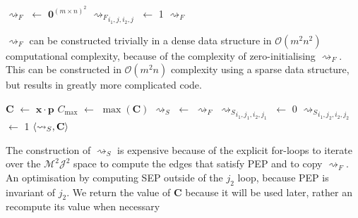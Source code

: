 \begin{algorithm}[H]
	\caption{}
	\begin{algorithmic}[1]
			\State $\rightsquigarrow_F$ $\gets$ $\mathbf{0}^{(m\times n)^2}$
							\State ${\rightsquigarrow_F}_{i_1,j,i_2,j}$ $\gets$ 1
						\EndIf
					\EndFor
				\EndFor
			\EndFor
			\State \Return $\rightsquigarrow_F$
		\EndFunction
	\end{algorithmic}
\end{algorithm}

$\rightsquigarrow_F$ can be constructed trivially in a dense data structure in $\mathcal{O}(m^2n^2)$ computational complexity, because of the complexity of zero-initialising $\rightsquigarrow_F$. This can be constructed in $\mathcal{O}(m^2n)$ complexity using a sparse data structure, but results in greatly more complicated code.

\begin{algorithm}[H]
	\caption{}
	\begin{algorithmic}[1]
			\State $\mathbf{C}$ $\gets$ $\mathbf{x}\cdot\mathbf{p}$
			\State $C_{\max}$ $\gets$ $\max(\mathbf{C})$
			\State $\rightsquigarrow_S$ $\gets$ $\rightsquigarrow_F$
									\State ${\rightsquigarrow_S}_{i_1,j_1,i_2,j_1}$ $\gets$ 0
								\EndIf
										\State ${\rightsquigarrow_S}_{i_1,j_2,i_2,j_2}$ $\gets$ 1
									\EndIf
								\EndFor
							\EndFor
						\EndIf
					\EndFor
				\EndIf
			\EndFor
			\State \Return $\langle{\rightsquigarrow_S},{\mathbf{C}}\rangle$
		\EndFunction
	\end{algorithmic}
\end{algorithm}

The construction of $\rightsquigarrow_S$ is expensive because of the explicit for-loops to iterate over the $\mathcal{M}^2\mathcal{J}^2$ space to compute the edges that satisfy PEP and to copy $\rightsquigarrow_F$. An optimisation by computing SEP outside of the $j_2$ loop, because PEP is invariant of $j_2$. We return the value of $\mathbf{C}$ because it will be used later, rather an recompute its value when necessary

